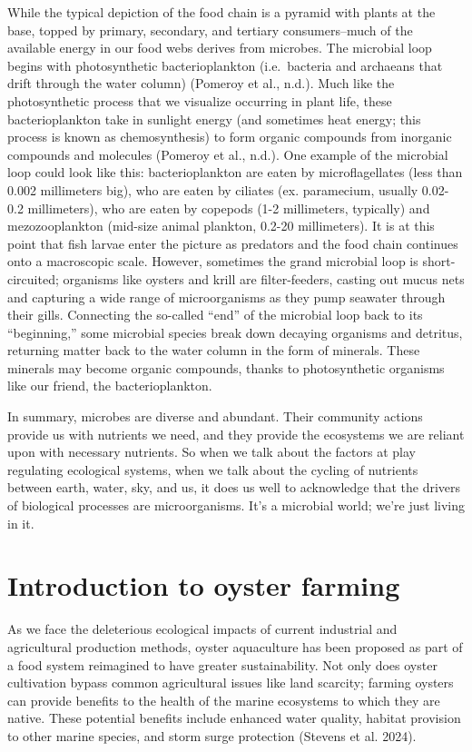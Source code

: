 \documentclass[
  11pt,
]{article}
\begin{document}
While the typical depiction of the food chain is a pyramid with plants
at the base, topped by primary, secondary, and tertiary consumers--much
of the available energy in our food webs derives from microbes. The
microbial loop begins with photosynthetic bacterioplankton
(i.e.~bacteria and archaeans that drift through the water column)
(Pomeroy et al., n.d.). Much like the photosynthetic process that we
visualize occurring in plant life, these bacterioplankton take in
sunlight energy (and sometimes heat energy; this process is known as
chemosynthesis) to form organic compounds from inorganic compounds and
molecules (Pomeroy et al., n.d.). One example of the microbial loop
could look like this: bacterioplankton are eaten by microflagellates
(less than 0.002 millimeters big), who are eaten by ciliates (ex.
paramecium, usually 0.02-0.2 millimeters), who are eaten by copepods
(1-2 millimeters, typically) and mezozooplankton (mid-size animal
plankton, 0.2-20 millimeters). It is at this point that fish larvae
enter the picture as predators and the food chain continues onto a
macroscopic scale. However, sometimes the grand microbial loop is
short-circuited; organisms like oysters and krill are filter-feeders,
casting out mucus nets and capturing a wide range of microorganisms as
they pump seawater through their gills. Connecting the so-called ``end''
of the microbial loop back to its ``beginning,'' some microbial species
break down decaying organisms and detritus, returning matter back to the
water column in the form of minerals. These minerals may become organic
compounds, thanks to photosynthetic organisms like our friend, the
bacterioplankton.

In summary, microbes are diverse and abundant. Their community actions
provide us with nutrients we need, and they provide the ecosystems we
are reliant upon with necessary nutrients. So when we talk about the
factors at play regulating ecological systems, when we talk about the
cycling of nutrients between earth, water, sky, and us, it does us well
to acknowledge that the drivers of biological processes are
microorganisms. It's a microbial world; we're just living in it.

\section{Introduction to oyster
farming}\label{introduction-to-oyster-farming}

As we face the deleterious ecological impacts of current industrial and
agricultural production methods, oyster aquaculture has been proposed as
part of a food system reimagined to have greater sustainability. Not
only does oyster cultivation bypass common agricultural issues like land
scarcity; farming oysters can provide benefits to the health of the
marine ecosystems to which they are native. These potential benefits
include enhanced water quality, habitat provision to other marine
species, and storm surge protection (Stevens et al. 2024).
\end{document}
